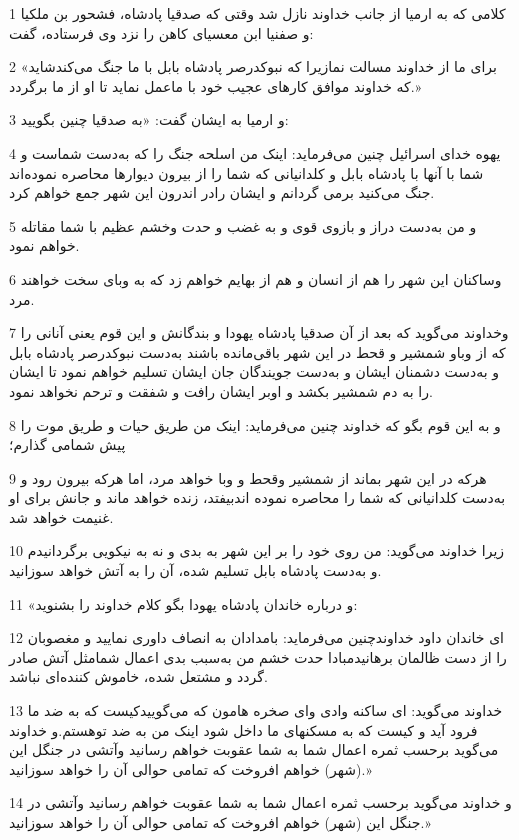 \par 1 کلامی که به ارمیا از جانب خداوند نازل شد وقتی که صدقیا پادشاه، فشحور بن ملکیا و صفنیا ابن معسیای کاهن را نزد وی فرستاده، گفت:
\par 2 «برای ما از خداوند مسالت نمازیرا که نبوکدرصر پادشاه بابل با ما جنگ می‌کندشاید که خداوند موافق کارهای عجیب خود با ماعمل نماید تا او از ما برگردد.»
\par 3 و ارمیا به ایشان گفت: «به صدقیا چنین بگویید:
\par 4 یهوه خدای اسرائیل چنین می‌فرماید: اینک من اسلحه جنگ را که به‌دست شماست و شما با آنها با پادشاه بابل و کلدانیانی که شما را از بیرون دیوارها محاصره نموده‌اند جنگ می‌کنید برمی گردانم و ایشان رادر اندرون این شهر جمع خواهم کرد.
\par 5 و من به‌دست دراز و بازوی قوی و به غضب و حدت وخشم عظیم با شما مقاتله خواهم نمود.
\par 6 وساکنان این شهر را هم از انسان و هم از بهایم خواهم زد که به وبای سخت خواهند مرد.
\par 7 وخداوند می‌گوید که بعد از آن صدقیا پادشاه یهودا و بندگانش و این قوم یعنی آنانی را که از وباو شمشیر و قحط در این شهر باقی‌مانده باشند به‌دست نبوکدرصر پادشاه بابل و به‌دست دشمنان ایشان و به‌دست جویندگان جان ایشان تسلیم خواهم نمود تا ایشان را به دم شمشیر بکشد و اوبر ایشان رافت و شفقت و ترحم نخواهد نمود. 
\par 8 و به این قوم بگو که خداوند چنین می‌فرماید: اینک من طریق حیات و طریق موت را پیش شمامی گذارم؛
\par 9 هرکه در این شهر بماند از شمشیر وقحط و وبا خواهد مرد، اما هر‌که بیرون رود و به‌دست کلدانیانی که شما را محاصره نموده اندبیفتد، زنده خواهد ماند و جانش برای او غنیمت خواهد شد.
\par 10 زیرا خداوند می‌گوید: من روی خود را بر این شهر به بدی و نه به نیکویی برگردانیدم و به‌دست پادشاه بابل تسلیم شده، آن را به آتش خواهد سوزانید.
\par 11 «و درباره خاندان پادشاه یهودا بگو کلام خداوند را بشنوید:
\par 12 ‌ای خاندان داود خداوندچنین می‌فرماید: بامدادان به انصاف داوری نمایید و مغصوبان را از دست ظالمان برهانیدمبادا حدت خشم من به‌سبب بدی اعمال شمامثل آتش صادر گردد و مشتعل شده، خاموش کننده‌ای نباشد.
\par 13 خداوند می‌گوید: ای ساکنه وادی و‌ای صخره هامون که می‌گوییدکیست که به ضد ما فرود آید و کیست که به مسکنهای ما داخل شود اینک من به ضد توهستم.و خداوند می‌گوید بر‌حسب ثمره اعمال شما به شما عقوبت خواهم رسانید وآتشی در جنگل این (شهر) خواهم افروخت که تمامی حوالی آن را خواهد سوزانید.»
\par 14 و خداوند می‌گوید بر‌حسب ثمره اعمال شما به شما عقوبت خواهم رسانید وآتشی در جنگل این (شهر) خواهم افروخت که تمامی حوالی آن را خواهد سوزانید.»
 
